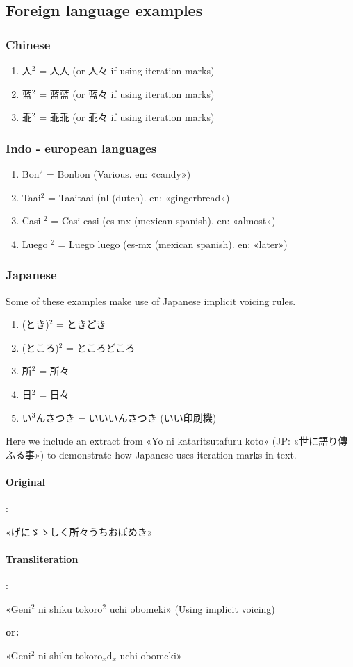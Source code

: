 \documentclass{article}
\newcommand{\h}[1]{$^{#1}$}
\newcommand{\s}[1]{$_{#1}$}
\begin{document}
\subsection{Foreign language examples}

\subsubsection{Chinese}

\begin{enumerate}
  \item 人\h{2} = 人人 (or 人々 if using iteration marks)
  \item 蓝\h{2} = 蓝蓝 (or 蓝々 if using iteration marks)
  \item 乖\h{2} = 乖乖 (or 乖々 if using iteration marks)
\end{enumerate}

\subsubsection{Indo - european languages}

\begin{enumerate}
  \item Bon\h{2} = Bonbon (Various. en: «candy»)
  \item Taai\h{2} = Taaitaai (nl (dutch). en: «gingerbread»)
  \item Casi \h{2} = Casi casi (es-mx (mexican spanish). en: «almost»)
  \item Luego \h{2} = Luego luego (es-mx (mexican spanish). en: «later»)
\end{enumerate}

\subsubsection{Japanese}

Some of these examples make use of Japanese implicit voicing rules.

\begin{enumerate}
  \item (とき)\h{2} = ときどき
  \item (ところ)\h{2} = ところどころ
  \item 所\h{2} = 所々
  \item 日\h{2} = 日々
  \item い\h{3}んさつき = いいいんさつき (いい印刷機)
\end{enumerate}

Here we include an extract from «Yo ni kataritsutafuru koto» (JP:
«世に語り傳ふる事») to demonstrate how Japanese uses iteration marks in text.

\paragraph{Original}:

«げにゞゝしく所々うちおぼめき» %

\paragraph{Transliteration}:

«Geni\h{2} ni shiku tokoro\h{2} uchi obomeki» (Using implicit voicing)

\textbf{or:}

«Geni\h{2} ni shiku tokoro\s{x}d\s{x} uchi obomeki»


\label{sec:intro}
\end{document}
